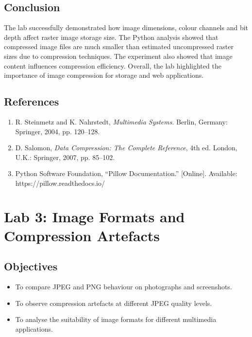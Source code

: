 \documentclass[12pt,a4paper]{article}
\begin{document}
\subsection{Conclusion}

The lab successfully demonstrated how image dimensions, colour channels and bit depth affect raster image storage size. The Python analysis showed that compressed image files are much smaller than estimated uncompressed raster sizes due to compression techniques. The experiment also showed that image content influences compression efficiency. Overall, the lab highlighted the importance of image compression for storage and web applications.

\subsection{References}

\begin{enumerate}
    \item R. Steinmetz and K. Nahrstedt, \textit{Multimedia Systems}. Berlin, Germany: Springer, 2004, pp. 120--128.
    
    \item D. Salomon, \textit{Data Compression: The Complete Reference}, 4th ed. London, U.K.: Springer, 2007, pp. 85--102.
    
    \item Python Software Foundation, ``Pillow Documentation.'' [Online]. Available: https://pillow.readthedocs.io/
\end{enumerate}
\newpage


\section{Lab 3: Image Formats and Compression Artefacts}

\subsection{Objectives}

\begin{itemize}
    \item To compare JPEG and PNG behaviour on photographs and screenshots.
    \item To observe compression artefacts at different JPEG quality levels.
    \item To analyse the suitability of image formats for different multimedia applications.
\end{itemize}
\end{document}

